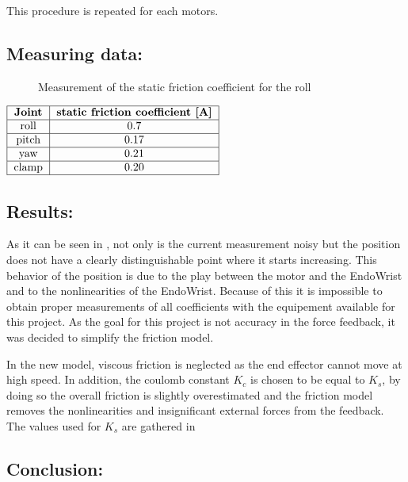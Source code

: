 This procedure is repeated for each motors.

\subsection*{Measuring data:}
\begin{figure}[H]
	\centering
	
	\caption{Measurement of the static friction coefficient for the roll}
	\label{fig:friction_measurement}
\end{figure}

\begin{center}
  $\begin{tabular}{|c|c|}
    \hline
    \textbf{Joint} & \textbf{static friction coefficient [A]} \\
    \hline
    roll & 0.7 \\
    \hline
    pitch & 0.17  \\
    \hline
    yaw & 0.21  \\
    \hline
    clamp & 0.20\\
    \hline
  \end{tabular}$
	\label{fig:static_friction_coefficient}
\end{center}
\subsection*{Results:}

As it can be seen in , not only is the current measurement noisy but the position does not have a clearly distinguishable point where it starts increasing. This behavior of the position is due to the play between the motor and the EndoWrist and to the nonlinearities of the EndoWrist. Because of this it is impossible to obtain proper measurements of all coefficients with the equipement available for this project. As the goal for this project is not accuracy in the force feedback, it was decided to simplify the friction model.

In the new model, viscous friction is neglected as the end effector cannot move at high speed. In addition, the coulomb constant $K_c$ is chosen to be equal to $K_s$, by doing so the overall friction is slightly overestimated and the friction model removes the nonlinearities and insignificant external forces from the feedback. The values used for $K_s$ are gathered in 
\subsection*{Conclusion:}

